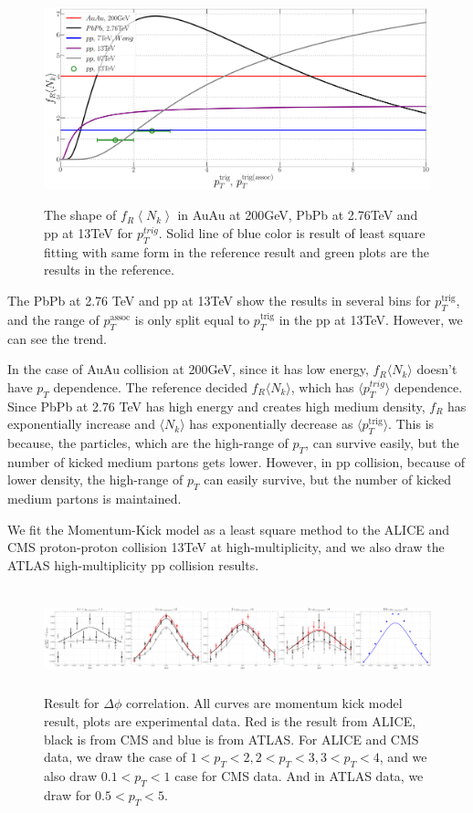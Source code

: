 \documentclass[jkps,fleqn,showpacs,showkeys]{revtex4}
\begin{document}
\begin{figure}[ht]
\centering
\includegraphics[width=12cm, height=6cm]{./Figures/Paper_frnk}
\caption{The shape of $f_R \left\langle N_k \right\rangle$ in AuAu at 200GeV, PbPb at 2.76TeV and pp at 13TeV for $p_{T}^{trig}$.
Solid line of blue color is result of least square fitting with same form in the reference\cite{PbPb} result and green plots are the results in the reference\cite{Hanul}.}
\label{figure:frnk}
\end{figure}

The PbPb at 2.76 TeV and pp at 13TeV show the results in several bins for $p_T^{\text{trig}}$, and the range of $p_T^{\text{assoc}}$ is only split equal to $p_T^{\text{trig}}$ in the pp at 13TeV. However, we can see the trend.


In the case of AuAu collision at 200GeV, since it has low energy, $f_R \langle N_k \rangle$ doesn't have $p_T$ dependence.
The reference\cite{PbPb} decided  $f_R \langle N_k \rangle$, which has $\langle p_T^{trig} \rangle$ dependence. Since PbPb at 2.76 TeV has high energy and creates high medium density, $f_R$ has exponentially increase and $\langle N_k \rangle$ has exponentially decrease as $\langle p_T^{\text{trig}} \rangle$. This is because, the particles, which are the high-range of $p_T$, can survive easily, but the number of kicked medium partons gets lower.
However, in pp collision, because of lower density, the high-range of $p_T$ can easily survive, but the number of kicked medium partons is maintained.

We fit the Momentum-Kick model as a least square method to the ALICE and CMS proton-proton collision 13TeV at high-multiplicity\cite{alice, cms}, and we also draw the ATLAS high-multiplicity pp collision results\cite{atlas}.

\begin{figure}[ht]
\centering
\includegraphics[width=18cm, height=3cm]{./Figures/Paper_phiCorr}
\caption{Result for $\Delta \phi$ correlation. All curves are momentum kick model result, plots are experimental data.
Red is the result from ALICE, black is from CMS and blue is from ATLAS.
For ALICE and CMS data, we draw the case of $1<p_T<2, 2<p_T<3, 3<p_T<4$, and we also draw $0.1<p_T<1$ case for CMS data. And in ATLAS data, we draw for $0.5<p_T<5$.}
\label{figure:phicorr}
\end{figure}
\end{document}
